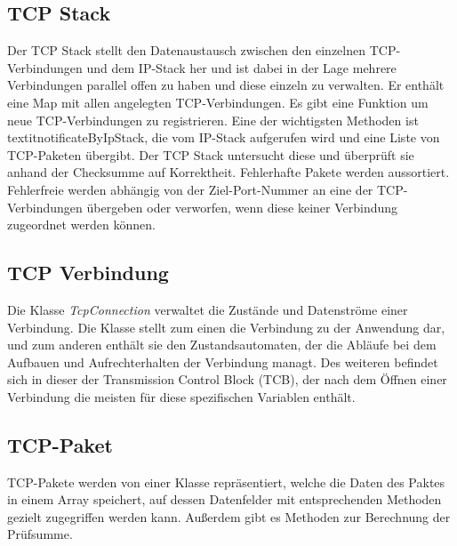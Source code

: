 \subsection{TCP Stack}
Der TCP Stack stellt den Datenaustausch zwischen den einzelnen TCP-Verbindungen und dem IP-Stack her und ist dabei in der Lage mehrere Verbindungen parallel offen zu haben und diese einzeln zu verwalten. 
Er enthält eine Map mit allen angelegten TCP-Verbindungen. Es gibt eine Funktion um neue TCP-Verbindungen zu registrieren. Eine der wichtigsten Methoden ist textit{notificateByIpStack}, die vom IP-Stack aufgerufen wird und eine Liste von TCP-Paketen übergibt. Der TCP Stack untersucht diese und überprüft sie anhand der Checksumme auf Korrektheit. Fehlerhafte Pakete werden aussortiert. Fehlerfreie werden abhängig von der Ziel-Port-Nummer an eine der TCP-Verbindungen übergeben oder verworfen, wenn diese keiner Verbindung zugeordnet werden können.   

\subsection{TCP Verbindung}
Die Klasse \textit{TcpConnection} verwaltet die Zustände und Datenströme einer Verbindung. Die Klasse stellt zum einen die Verbindung zu der Anwendung dar, und zum anderen enthält sie den Zustandsautomaten, der die Abläufe bei dem Aufbauen und Aufrechterhalten der Verbindung managt. Des weiteren befindet sich in dieser der Transmission Control Block (TCB), der nach dem Öffnen einer Verbindung die meisten für diese spezifischen Variablen enthält.   

\subsection{TCP-Paket}
TCP-Pakete werden von einer Klasse repräsentiert, welche die Daten des Paktes in einem Array speichert, auf dessen Datenfelder mit entsprechenden Methoden gezielt zugegriffen werden kann. Außerdem gibt es Methoden zur Berechnung der Prüfsumme.


